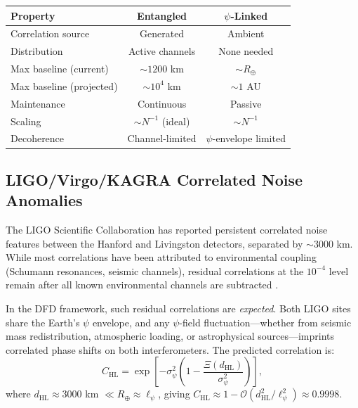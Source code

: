 \documentclass[12pt,a4paper]{article}
\theoremstyle{remark}
\begin{document}
\begin{tcolorbox}[colback=blue!5!white, colframe=blue!60!black,
title=Comparison: Entanglement-Based vs.\ $\psi$-Linked Networks]
\begin{tabular}{lcc}
\toprule
\textbf{Property} & \textbf{Entangled} & \textbf{$\psi$-Linked} \\
\midrule
Correlation source & Generated & Ambient \\
Distribution & Active channels & None needed \\
Max baseline (current) & $\sim 1200$ km & $\sim R_\oplus$ \\
Max baseline (projected) & $\sim 10^4$ km & $\sim 1$ AU \\
Maintenance & Continuous & Passive \\
Scaling & $\sim N^{-1}$ (ideal) & $\sim N^{-1}$ \\
Decoherence & Channel-limited & $\psi$-envelope limited \\
\bottomrule
\end{tabular}
\end{tcolorbox}

\subsection{LIGO/Virgo/KAGRA Correlated Noise Anomalies}

The LIGO Scientific Collaboration has reported persistent correlated noise
features between the Hanford and Livingston detectors, separated by
$\sim 3000$ km. While most correlations have been attributed to
environmental coupling (Schumann resonances, seismic channels), residual
correlations at the $10^{-4}$ level remain after all known environmental
channels are subtracted \cite{Coughlin2016,Meyers2020}.

In the DFD framework, such residual correlations are \emph{expected}. Both
LIGO sites share the Earth's $\psi$ envelope, and any $\psi$-field
fluctuation---whether from seismic mass redistribution, atmospheric loading,
or astrophysical sources---imprints correlated phase shifts on both
interferometers. The predicted correlation is:
\begin{equation}
C_{\text{HL}} = \exp\!\left[-\sigma_\psi^2\left(1 - \frac{\Xi(d_{\text{HL}})}{\sigma_\psi^2}\right)\right],
\end{equation}
where $d_{\text{HL}} \approx 3000$ km $\ll R_\oplus \approx \ell_\psi$,
giving $C_{\text{HL}} \approx 1 - \mathcal{O}(d_{\text{HL}}^2/\ell_\psi^2)
\approx 0.9998$.
\end{document}

